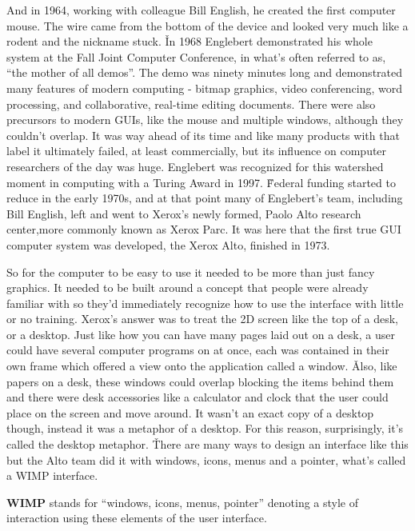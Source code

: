 And in 1964, working with colleague Bill English, he created the first computer mouse. The wire came from the bottom
of the device and looked very much like a rodent and the nickname stuck. \v

In 1968 Englebert demonstrated his whole system at the Fall Joint Computer Conference, in what's often referred to
as, ``the mother of all demos''. The demo was ninety minutes long and demonstrated many features of modern computing
- bitmap graphics, video conferencing, word processing, and collaborative, real-time editing documents. There were
also precursors to modern GUIs, like the mouse and multiple windows, although they couldn't overlap. It was way ahead
of its time and like many products with that label it ultimately failed, at least commercially, but its influence on
computer researchers of the day was huge. Englebert was recognized for this watershed moment in computing with a
Turing Award in 1997. \v

Federal funding started to reduce in the early 1970s, and at that point many of Englebert's team, including Bill
English, left and went to Xerox's newly formed, Paolo Alto research center,more commonly known as Xerox Parc. It was
here that the first true GUI computer system was developed, the Xerox Alto, finished in 1973.


So for the computer to be easy to use it needed to be more than just fancy graphics. It needed to be built around a
concept that people were already familiar with so they'd immediately recognize how to use the interface with little
or no training. Xerox's answer was to treat the 2D screen like the top of a desk, or a desktop. Just like how you can
have many pages laid out on a desk, a user could have several computer programs on at once, each was contained in
their own frame which offered a view onto the application called a window. \v

Also, like papers on a desk, these windows could overlap blocking the items behind them and there were desk
accessories like a calculator and clock that the user could place on the screen and move around. It wasn't an exact
copy of a desktop though, instead it was a metaphor of a desktop. For this reason, surprisingly, it's called the
desktop metaphor. \v

There are many ways to design an interface like this but the Alto team did it with windows, icons, menus and a
pointer, what's called a WIMP interface.

\bd[WIMP]
\textbf{WIMP} stands for ``windows, icons, menus, pointer'' denoting a style of interaction using these elements of the
user interface.
\ed

